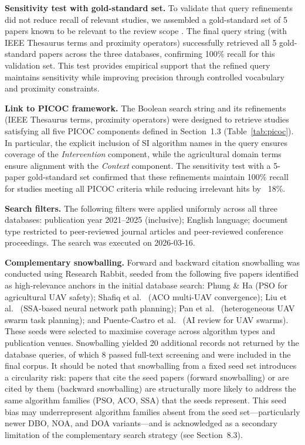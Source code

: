 \documentclass[review,3p,times]{elsarticle}
\begin{document}
\textbf{Sensitivity test with gold-standard set.} To validate that query refinements did not reduce recall of relevant studies, we assembled a gold-standard set of 5 papers known to be relevant to the review scope \cite{phung2021,shafiq2022,liu2021,pan2022,puente2022}. The final query string (with IEEE Thesaurus terms and proximity operators) successfully retrieved all 5 gold-standard papers across the three databases, confirming 100\% recall for this validation set. This test provides empirical support that the refined query maintains sensitivity while improving precision through controlled vocabulary and proximity constraints.

\textbf{Link to PICOC framework.} The Boolean search string and its refinements (IEEE Thesaurus terms, proximity operators) were designed to retrieve studies satisfying all five PICOC components defined in Section~1.3 (Table~\ref{tab:picoc}). In particular, the explicit inclusion of SI algorithm names in the query ensures coverage of the \textit{Intervention} component, while the agricultural domain terms ensure alignment with the \textit{Context} component. The sensitivity test with a 5-paper gold-standard set confirmed that these refinements maintain 100\% recall for studies meeting all PICOC criteria while reducing irrelevant hits by ~18\%.

\textbf{Search filters.} The following filters were applied uniformly across all three databases: publication year 2021--2025 (inclusive); English language; document type restricted to peer-reviewed journal articles and peer-reviewed conference proceedings. The search was executed on 2026-03-16.

\textbf{Complementary snowballing.} Forward and backward citation snowballing was conducted using Research Rabbit, seeded from the following five papers identified as high-relevance anchors in the initial database search: Phung \& Ha \cite{phung2021} (PSO for agricultural UAV safety); Shafiq et al.\ \cite{shafiq2022} (ACO multi-UAV convergence); Liu et al.\ \cite{liu2021} (SSA-based neural network path planning); Pan et al.\ \cite{pan2022} (heterogeneous UAV swarm task planning); and Puente-Castro et al.\ \cite{puente2022} (AI review for UAV swarms). These seeds were selected to maximise coverage across algorithm types and publication venues. Snowballing yielded 20 additional records not returned by the database queries, of which 8 passed full-text screening and were included in the final corpus. It should be noted that snowballing from a fixed seed set introduces a circularity risk: papers that cite the seed papers (forward snowballing) or are cited by them (backward snowballing) are structurally more likely to address the same algorithm families (PSO, ACO, SSA) that the seeds represent. This seed bias may underrepresent algorithm families absent from the seed set---particularly newer DBO, NOA, and DOA variants---and is acknowledged as a secondary limitation of the complementary search strategy (see Section~8.3).
\end{document}
